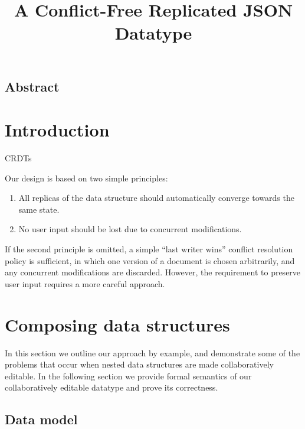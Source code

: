 \documentclass[a4paper,twocolumn,10pt]{article}
\begin{document}
\sloppy
\title{A Conflict-Free Replicated JSON Datatype}
\author{}
\maketitle

\subsection*{Abstract}

\section{Introduction}

CRDTs~\cite{Shapiro:2011wy,Roh:2011dw}

%

Our design is based on two simple principles:
\begin{enumerate}
\item All replicas of the data structure should automatically converge towards the same state.
\item No user input should be lost due to concurrent modifications.
\end{enumerate}

If the second principle is omitted, a simple ``last writer wins'' conflict resolution policy is sufficient, in which one version of a document is chosen arbitrarily, and any concurrent modifications are discarded. However, the requirement to preserve user input requires a more careful approach.

\section{Composing data structures}

In this section we outline our approach by example, and demonstrate some of the problems that occur when nested data structures are made collaboratively editable. In the following section we provide formal semantics of our collaboratively editable datatype and prove its correctness.

\subsection{Data model}
\end{document}
